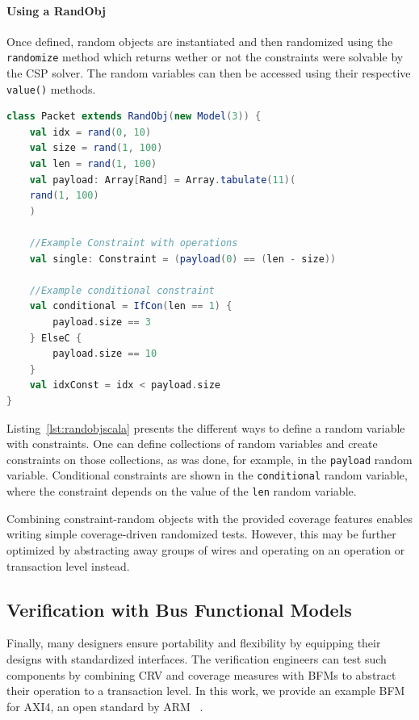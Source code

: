 \documentclass[conference]{IEEEtran}
\begin{document}
\paragraph{Using a RandObj} Once defined, random objects are instantiated and then randomized using the \texttt{randomize} method which returns wether or not the constraints were solvable by the CSP solver. 
The random variables can then be accessed using their respective \texttt{value()} methods.

\begin{lstlisting}[language=scala, caption={Usage of a random object. \texttt{rand(min, max, type=Normal)} is used to declare a random variable. Any operation on a random variable generates a constraint.}, label={lst:randobjscala}]    
class Packet extends RandObj(new Model(3)) {
    val idx = rand(0, 10)
    val size = rand(1, 100)
    val len = rand(1, 100)
    val payload: Array[Rand] = Array.tabulate(11)(
 	rand(1, 100)
    )

    //Example Constraint with operations
    val single: Constraint = (payload(0) == (len - size))
	
    //Example conditional constraint
    val conditional = IfCon(len == 1) {
        payload.size == 3
    } ElseC {
        payload.size == 10
    }
    val idxConst = idx < payload.size
}
\end{lstlisting}

Listing~\ref{lst:randobjscala} presents the different ways to define a random variable with constraints.
One can define collections of random variables and create constraints on those collections, as was done, for example, in the \texttt{payload} random variable. 
Conditional constraints are shown in the \texttt{conditional} random variable, where the constraint depends on the value of the \texttt{len} random variable. 

Combining constraint-random objects with the provided coverage features enables writing simple coverage-driven randomized tests. 
However, this may be further optimized by abstracting away groups of wires and operating on an operation or transaction level instead.

\subsection{Verification with Bus Functional Models}
Finally, many designers ensure portability and flexibility by equipping their designs with standardized interfaces. 
The verification engineers can test such components by combining CRV and coverage measures with BFMs to abstract their 
operation to a transaction level. In this work, we provide an example BFM for AXI4, an open standard by ARM~
\cite{axi4standard}.
\end{document}
